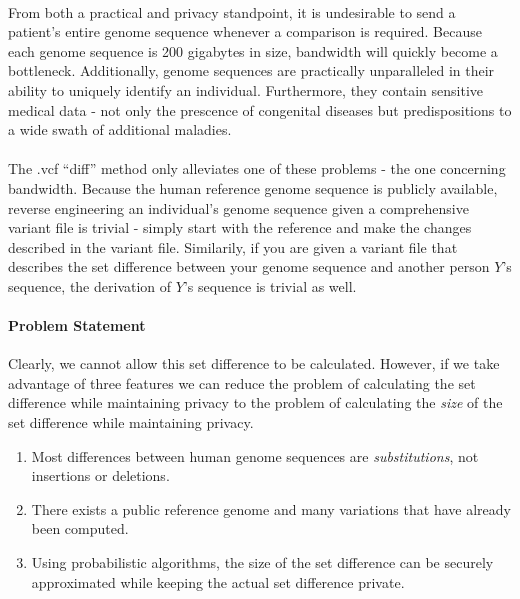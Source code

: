 \paragraph{}
From both a practical and privacy standpoint, it is undesirable to send a patient's entire genome sequence whenever a comparison is required. Because each genome sequence is 200 gigabytes in size, bandwidth will quickly become a bottleneck. Additionally, genome sequences are practically unparalleled in their ability to uniquely identify an individual. Furthermore, they contain sensitive medical data - not only the prescence of congenital diseases but predispositions to a wide swath of additional maladies.

\paragraph{}
The .vcf ``diff'' method only alleviates one of these problems - the one concerning bandwidth. Because the human reference genome sequence is publicly available, reverse engineering an individual's genome sequence given a comprehensive variant file is trivial - simply start with the reference and make the changes described in the variant file. Similarily, if you are given a variant file that describes the set difference between your genome sequence and another person $Y$'s sequence, the derivation of $Y$'s sequence is trivial as well. 

\paragraph{Problem Statement}
Clearly, we cannot allow this set difference to be calculated. However, if we take advantage of three features we can reduce the problem of calculating the set difference while maintaining privacy to the problem of calculating the \textit{size} of the set difference while maintaining privacy.

\begin{enumerate}
\item Most differences between human genome sequences are \textit{substitutions}, not insertions or deletions.
\item There exists a public reference genome and many variations that have already been computed.
\item Using probabilistic algorithms, the size of the set difference can be securely approximated while keeping the actual set difference private.
\end{enumerate}

